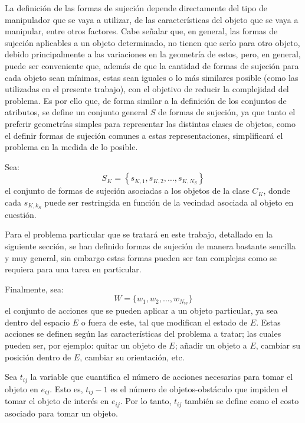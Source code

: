 La definición de las formas de sujeción depende directamente del tipo de manipulador que se vaya a utilizar, de las características del objeto que se vaya a manipular, entre otros factores. 
Cabe señalar que, en general, las formas de sujeción aplicables a un objeto determinado, no tienen que serlo para otro objeto, debido principalmente a las variaciones en la geometría de estos, pero, en general, puede ser conveniente que, además de que la cantidad de formas de sujeción para cada objeto sean mínimas, estas sean iguales o lo más similares posible (como las utilizadas en el presente trabajo), con el objetivo de reducir la complejidad del problema.
Es por ello que, de forma similar a la definición de los conjuntos de atributos, se define un conjunto general $S$ de formas de sujeción, ya que tanto el preferir geometrías simples para representar las distintas clases de objetos, como el definir formas de sujeción comunes a estas representaciones, simplificará el problema en la medida de lo posible.


Sea:
%
\begin{equation}
\label{eq:sujecion_objeto}
S_K = \left\{s_{K, 1}, s_{K, 2}, \ldots, s_{K, N_S}\right\}
\end{equation}
%
el conjunto de formas de sujeción asociadas a los objetos de la clase $C_K$, donde cada $s_{K, k_S}$ puede ser restringida en función de la vecindad asociada al objeto en cuestión.

Para el problema particular que se tratará en este trabajo, detallado en la siguiente sección, se han definido formas de sujeción de manera bastante sencilla y muy general, sin embargo estas formas pueden ser tan complejas como se requiera para una tarea en particular.

Finalmente, sea:
%
\begin{equation}
\label{eq:acciones}
W = \{w_1, w_2, \ldots, w_{N_W}\}
\end{equation}
%
el conjunto de acciones que se pueden aplicar a un objeto particular, ya sea dentro del espacio $E$ o fuera de este, tal que modifican el estado de $E$.
Estas acciones se definen según las características del problema a tratar; las cuales pueden ser, por ejemplo: quitar un objeto de $E$; añadir un objeto a $E$, cambiar su posición dentro de $E$, cambiar su orientación, etc. 

Sea $t_{ij}$ la variable que cuantifica el número de acciones necesarias para tomar el objeto en $e_{ij}$.
Esto es, $t_{ij}-1$ es el número de objetos-obstáculo que impiden el tomar el objeto de interés en $e_{ij}$.
Por lo tanto, $t_{ij}$ también se define como el costo asociado para tomar un objeto.

